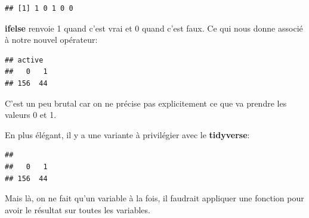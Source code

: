 \documentclass[
]{book}
\newenvironment{Shaded}{\begin{snugshade}}{\end{snugshade}}
\newcommand{\AttributeTok}[1]{\textcolor[rgb]{0.13,0.29,0.53}{#1}}
\newcommand{\ConstantTok}[1]{\textcolor[rgb]{0.56,0.35,0.01}{#1}}
\newcommand{\DecValTok}[1]{\textcolor[rgb]{0.00,0.00,0.81}{#1}}
\newcommand{\FunctionTok}[1]{\textcolor[rgb]{0.13,0.29,0.53}{\textbf{#1}}}
\newcommand{\NormalTok}[1]{#1}
\newcommand{\OtherTok}[1]{\textcolor[rgb]{0.56,0.35,0.01}{#1}}
\newcommand{\SpecialCharTok}[1]{\textcolor[rgb]{0.81,0.36,0.00}{\textbf{#1}}}
\begin{document}
\begin{verbatim}
## [1] 1 0 1 0 0
\end{verbatim}

\textbf{ifelse} renvoie 1 quand c'est vrai et 0 quand c'est faux. Ce qui nous donne
associé à notre nouvel opérateur:

\begin{Shaded}
\end{Shaded}

\begin{verbatim}
## active
##   0   1 
## 156  44
\end{verbatim}

C'est un peu brutal car on ne précise pas explicitement ce que va prendre les
valeurs 0 et 1.

En plus élégant, il y a une variante à privilégier avec le \textbf{tidyverse}:

\begin{Shaded}
\end{Shaded}

\begin{verbatim}
## 
##   0   1 
## 156  44
\end{verbatim}

Mais là, on ne fait qu'un variable à la fois, il faudrait appliquer une fonction
pour avoir le résultat sur toutes les variables.
\end{document}
